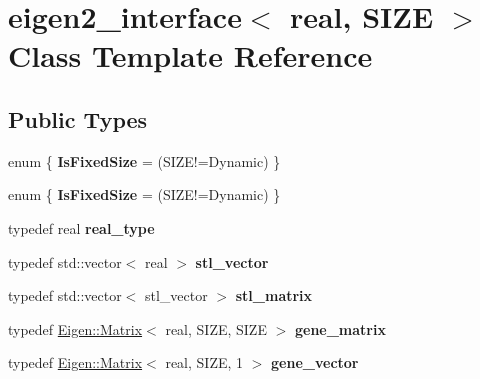 \hypertarget{classeigen2__interface}{}\section{eigen2\+\_\+interface$<$ real, S\+I\+ZE $>$ Class Template Reference}
\label{classeigen2__interface}
\subsection*{Public Types}
\begin{DoxyCompactItemize}
\item 
\mbox{\label{classeigen2__interface_a285d1f9395f89b3470370f5ffc9f9f28}} 
enum \{ {\bfseries Is\+Fixed\+Size} = (S\+I\+Z\+E!=Dynamic)
 \}
\item 
\mbox{\label{classeigen2__interface_a62fd0d9fb2841b8e418a3ae13a97fbe0}} 
enum \{ {\bfseries Is\+Fixed\+Size} = (S\+I\+Z\+E!=Dynamic)
 \}
\item 
\mbox{\label{classeigen2__interface_a6f1b17cf35a7e234f1efe8cba3df654a}} 
typedef real {\bfseries real\+\_\+type}
\item 
\mbox{\label{classeigen2__interface_a841d65dabee79471dad82cd2c55b1301}} 
typedef std\+::vector$<$ real $>$ {\bfseries stl\+\_\+vector}
\item 
\mbox{\label{classeigen2__interface_a879808f0d89360f35d52b489e0c9f3c6}} 
typedef std\+::vector$<$ stl\+\_\+vector $>$ {\bfseries stl\+\_\+matrix}
\item 
\mbox{\label{classeigen2__interface_ab25bad0d468705f8b44485b542476370}} 
typedef \hyperlink{group___core___module_class_eigen_1_1_matrix}{Eigen\+::\+Matrix}$<$ real, S\+I\+ZE, S\+I\+ZE $>$ {\bfseries gene\+\_\+matrix}
\item 
\mbox{\label{classeigen2__interface_aca955ca62710bc55f92ca70e2841cb25}} 
typedef \hyperlink{group___core___module_class_eigen_1_1_matrix}{Eigen\+::\+Matrix}$<$ real, S\+I\+ZE, 1 $>$ {\bfseries gene\+\_\+vector}
\item 

\end{DoxyCompactItemize}
